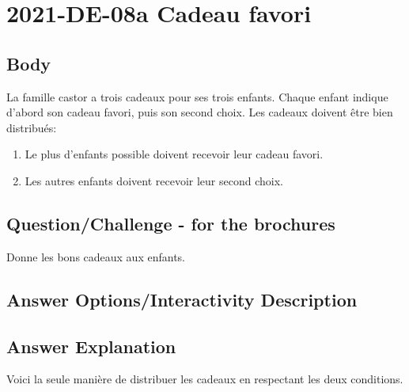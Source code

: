 \documentclass[a4paper,11pt]{report}
\newcommand{\taskGraphicsFolder}{..}
\begin{document}
\section*{\centering{} 2021-DE-08a Cadeau favori}


\subsection*{Body}

La famille castor a trois cadeaux pour ses trois enfants. Chaque enfant indique d’abord son cadeau favori, puis son second choix. Les cadeaux doivent être bien distribués:

\begin{enumerate}
  \item Le plus d’enfants possible doivent recevoir leur cadeau favori.
  \item Les autres enfants doivent recevoir leur second choix.
\end{enumerate}

{\em


\subsection*{Question/Challenge - for the brochures}

Donne les bons cadeaux aux enfants.

{\centering%
\par}

}

\begingroup
\renewcommand{\arraystretch}{1.5}
\subsection*{Answer Options/Interactivity Description}



\endgroup

\subsection*{Answer Explanation}

Voici la seule manière de distribuer les cadeaux en respectant les deux conditions.

{\centering%
\par}
\end{document}
